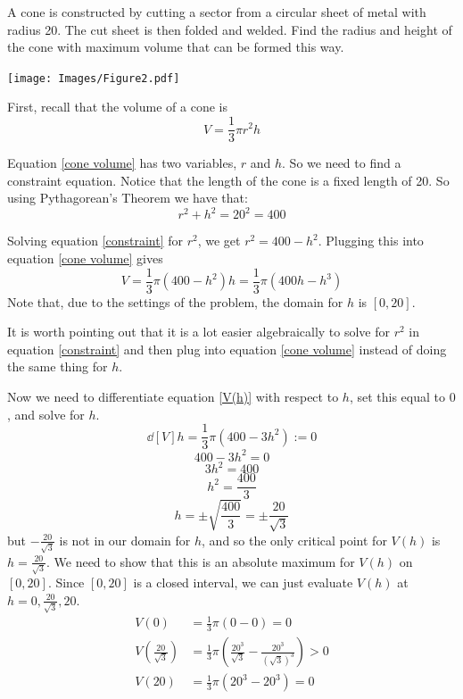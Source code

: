 \documentclass[nooutcomes]{ximera}
\begin{document}
\begin{problem}
  A cone is constructed by cutting a sector from a circular sheet of metal with radius 20.
  The cut sheet is then folded and welded.
  Find the radius and height of the cone with maximum volume that can be formed this way.

  \begin{image}
    \texttt{[image: Images/Figure2.pdf]}
  \end{image}
	
  \begin{freeResponse}
    First, recall that the volume of a cone is
    \begin{equation}
      \label{cone volume}
      V = \frac{1}{3} \pi r^2 h
    \end{equation}
		
    Equation \eqref{cone volume} has two variables, $r$ and $h$.  
    So we need to find a constraint equation.  
    Notice that the length of the cone is a fixed length of 20.  
    So using Pythagorean's Theorem we have that:
    \begin{equation}
      \label{constraint}
      r^2 + h^2 = 20^2 = 400
    \end{equation}
		
    Solving equation \eqref{constraint} for $r^2$, we get $r^2 = 400 - h^2$.  
    Plugging this into equation \eqref{cone volume} gives
    \begin{equation}
      \label{V(h)}
      V = \frac{1}{3} \pi (400-h^2) h = \frac{1}{3} \pi (400h - h^3) 
    \end{equation}
    Note that, due to the settings of the problem, the domain for $h$ is $[0,20]$.  
		
    It is worth pointing out that it is a lot easier algebraically to solve for $r^2$ in equation \eqref{constraint} and then plug into equation \eqref{cone volume} instead of doing the same thing for $h$.

    Now we need to differentiate equation \eqref{V(h)} with respect to $h$, set this equal to $0$, and solve for $h$.
    $$ \dd[V]{h} = \frac{1}{3} \pi (400 - 3h^2) := 0 $$
    $$ 400 - 3h^2 = 0 $$
    $$ 3h^2 = 400 $$
    $$ h^2 = \frac{400}{3} $$
    $$ h = \pm \sqrt{\frac{400}{3}} = \pm \frac{20}{\sqrt{3}} $$
    but $- \frac{20}{\sqrt{3}}$ is not in our domain for $h$, and so the only critical point for $V(h)$ is $h = \frac{20}{\sqrt{3}}$.  
    We need to show that this is an absolute maximum for $V(h)$ on $[0,20]$.  
    Since $[0,20]$ is a closed interval, we can just evaluate $V(h)$ at $h=0, \frac{20}{\sqrt{3}}, 20$.  
    \begin{align}
      V(0) &= \frac{1}{3} \pi (0-0) = 0 \\
      V \left( \frac{20}{\sqrt{3}} \right) &= \frac{1}{3} \pi \left( \frac{20^3}{\sqrt{3}} - \frac{20^3}{\left( \sqrt{3} \right)^3} \right) > 0 \label{inequality} \\
      V(20) &= \frac{1}{3} \pi (20^3 - 20^3) = 0 
    \end{align}
		

\end{freeResponse}
\end{problem}
\end{document}
